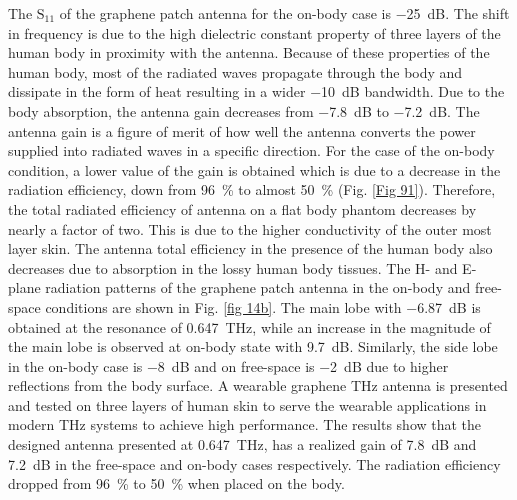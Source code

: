 \documentclass[12pt]{suhbook}
\begin{document}
% 
The $\mathrm{S_{11}}$ of the graphene patch antenna for the on-body case is \SI{-25}{\dB}. The shift in frequency is due to the high dielectric constant property of three layers of the human body in proximity with the antenna. Because of these properties of the human body, most of the radiated waves propagate through the body and dissipate in the form of heat resulting in a wider \SI{-10}{\dB} bandwidth. Due to the body absorption, the antenna gain decreases from \SI{-7.8}{\dB} to \SI{-7.2}{\dB}. The antenna gain is a figure of merit of how well the antenna converts the power supplied into radiated waves in a specific direction. For the case of the on-body condition, a lower value of the gain is obtained which is due to a decrease in the radiation efficiency, down from \SI{96}{\percent} to almost \SI{50}{\percent} (Fig. \ref{Fig 91}). Therefore, the total radiated efficiency of antenna on a flat body phantom decreases by nearly a factor of two. This is due to the higher conductivity of the outer most layer skin. The antenna total efficiency in the presence of the human body also decreases due to absorption in the lossy human body tissues. The H- and E- plane radiation patterns of the graphene patch antenna in the on-body and free-space conditions are shown in Fig. \ref{fig 14b}. The main lobe with \SI{-6.87}{\dB} is obtained at the resonance of \SI{0.647}{\THz}, while an increase in the magnitude of the main lobe is observed at on-body state with \SI{9.7}{\dB}. Similarly, the side lobe in the on-body case is \SI{-8}{\dB} and on free-space is \SI{-2}{\dB}  due to higher reflections from the body surface.
A wearable graphene THz antenna is presented and tested on three layers of human skin to serve the wearable applications in modern THz systems to achieve high performance. The results show that the designed antenna presented at \SI{0.647}{\THz}, has a realized gain of \SI{7.8}{\dB} and \SI{7.2}{\dB} in the free-space and on-body cases respectively. The radiation efficiency dropped from \SI{96}{\percent} to \SI{50}{\percent} when placed on the body.
\end{document}
